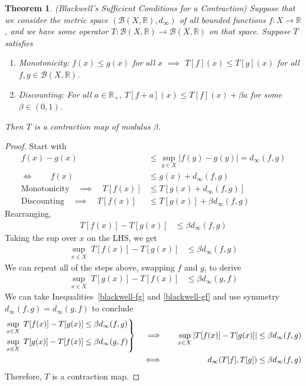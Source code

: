 \documentclass[12pt]{article}
\numberwithin{equation}{section} %
\theoremstyle{plain}
\newtheorem{thm}{Theorem}[section]
\theoremstyle{definition}
\theoremstyle{remark}
\newcommand{\ra}{\rightarrow}
\newcommand{\sB}{\mathscr{B}}
\newcommand{\R}{\mathbb{R}}
\newenvironment{rcases}
  {\left.\begin{aligned}}
  {\end{aligned}\right\rbrace}
\begin{document}
\begin{thm}{\emph{(Blackwell's Sufficient Conditions for a Contraction)}}
Suppose that we consider the metric space $(\sB(X,\R),d_\infty)$
of all bounded functions $f:X\ra\R$, and we
have some operator
$T:\mathscr{B}(X,\R)\rightarrow\mathscr{B}(X,\R)$ on that space.
Suppose $T$ satisfies
\begin{enumerate}
  \item \emph{Monotonicity}: $f(x) \leq g(x)$ for all $x$
    $\implies$ $T[f](x) \leq T[g](x)$ for all $f,g\in \sB(X,\R)$.
  \item \emph{Discounting}: For all $a\in\R_+$,
    $T[f+a](x) \leq T[f](x) + \beta a$ for some $\beta\in(0,1)$.
\end{enumerate}
Then $T$ is a contraction map of modulus $\beta$.
\end{thm}
\begin{proof}
Start with
\begin{align*}
  f(x)-g(x) &\leq \sup_{y\in X} |f(y)-g(y)| = d_\infty(f,g) \\
  \iff\qquad
  f(x) &\leq g(x) + d_\infty(f,g) \\
  \text{Monotonicity} \quad
  \implies\quad
  T[f(x)] &\leq T[g(x) + d_\infty(f,g)]
  \\
  \text{Discounting} \quad
  \implies\quad
  T[f(x)] &\leq T[g(x)] + \beta d_\infty(f,g)
\end{align*}
Rearranging,
\begin{align*}
  T[f(x)] - T[g(x)] &\leq \beta d_\infty(f,g)
\end{align*}
Taking the sup over $x$ on the LHS, we get
\begin{align}
  \sup_{x\in X} \; T[f(x)] - T[g(x)] &\leq \beta d_\infty(f,g)
  \label{blackwell-fg}
\end{align}
We can repeat all of the steps above, swapping $f$ and $g$, to derive
\begin{align}
  \sup_{x\in X} \; T[g(x)] - T[f(x)] &\leq \beta d_\infty(g,f)
  \label{blackwell-gf}
\end{align}
We can take Inequalities~\ref{blackwell-fg} and \ref{blackwell-gf} and
use symmetry $d_\infty(f,g)=d_\infty(g,f)$ to conclude
\begin{alignat*}{3}
  \begin{rcases}
  \sup_{x\in X} \; T[f(x)] - T[g(x)] &\leq \beta d_\infty(f,g)
  \\
  \sup_{x\in X} \; T[g(x)] - T[f(x)] &\leq \beta d_\infty(g,f)
  \end{rcases}
  \quad\implies&&\quad
  \sup_{x\in X} \left\lvert T[f(x)] - T[g(x)]\right\rvert
    &\leq \beta d_\infty(f,g) \\
  \iff&&\qquad
  d_\infty(T[f],T[g])
  &\leq \beta d_\infty(f,g)
\end{alignat*}
Therefore, $T$ is a contraction map.
\end{proof}
\end{document}
